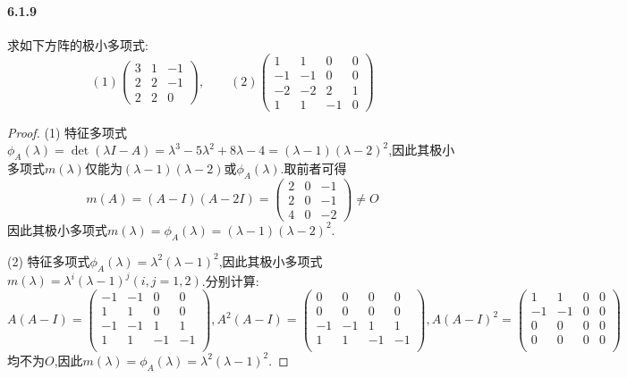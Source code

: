 \documentclass[11pt]{article}
\begin{document}
\paragraph{6.1.9}求如下方阵的极小多项式:
$$(1) \begin{pmatrix}
    3&1&-1\\ 2&2&-1\\ 2&2&0
\end{pmatrix},\qquad (2) \begin{pmatrix}
    1&1&0&0\\ -1&-1&0&0\\ -2&-2&2&1\\ 1&1&-1&0
\end{pmatrix}$$
\begin{proof}
    (1) 特征多项式$\phi_A(\lambda)=\det(\lambda I-A)=\lambda^3-5 \lambda^2+8 \lambda-4=(\lambda-1)(\lambda-2)^2$,因此其极小多项式$m(\lambda)$仅能为$(\lambda-1)(\lambda-2)$或$\phi_A(\lambda)$.取前者可得
    $$m(A)=(A-I)(A-2I)=\begin{pmatrix}
        2&0&-1\\ 2&0&-1\\ 4&0&-2
    \end{pmatrix}\neq O$$
    因此其极小多项式$m(\lambda)=\phi_A(\lambda)=(\lambda-1)(\lambda-2)^2$.

    (2) 特征多项式$\phi_A(\lambda)=\lambda^2(\lambda-1)^2$,因此其极小多项式$m(\lambda)=\lambda^i(\lambda-1)^j (i,j=1,2)$.分别计算:
    $$A(A-I)=\begin{pmatrix}
        -1 & -1 & 0 & 0 \\
        1 & 1 & 0 & 0 \\
        -1 & -1 & 1 & 1 \\
        1 & 1 & -1 & -1 \\
    \end{pmatrix},
    A^2(A-I)=\begin{pmatrix}
        0 & 0 & 0 & 0 \\
        0 & 0 & 0 & 0 \\
        -1 & -1 & 1 & 1 \\
        1 & 1 & -1 & -1 \\
    \end{pmatrix},
    A(A-I)^2=\begin{pmatrix}
        1 & 1 & 0 & 0 \\
        -1 & -1 & 0 & 0 \\
        0 & 0 & 0 & 0 \\
        0 & 0 & 0 & 0 \\
    \end{pmatrix}$$
    均不为$O$,因此$m(\lambda)=\phi_A(\lambda)=\lambda^2(\lambda-1)^2$.
\end{proof}
\end{document}
